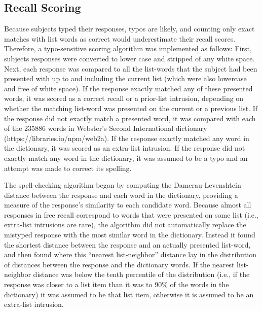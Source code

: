 \documentclass[jou,natbib]{apa6} %
\begin{document}
\subsection{Recall Scoring}
Because subjects typed their responses, typos are likely, and counting only exact matches with list words as correct would underestimate their recall scores. Therefore, a typo-sensitive scoring algorithm was implemented as follows: First, subjects responses were converted to lower case and stripped of any white space. Next, each response was compared to all the list-words that the subject had been presented with up to and including the current list (which were also lowercase and free of white space). If the response exactly matched any of these presented words, it was scored as a correct recall or a prior-list intrusion, depending on whether the matching list-word was presented on the current or a previous list. If the response did not exactly match a presented word, it was compared with each of the 235886 words in Webster's Second International dictionary (https://libraries.io/npm/web2a). If the response exactly matched any word in the dictionary, it was scored as an extra-list intrusion. If the response did not exactly match any word in the dictionary, it was assumed to be a typo and an attempt was made to correct its spelling.

The spell-checking algorithm began by computing the Damerau-Levenshtein distance \citep{Dame64} between the response and each word in the dictionary, providing a measure of the response's similarity to each candidate word. Because almost all responses in free recall correspond to words that were presented on some list (i.e., extra-list intrusions are rare), the algorithm did not automatically replace the mistyped response with the most similar word in the dictionary. Instead it found the shortest distance between the response and an actually presented list-word, and then found where this ``nearest list-neighbor'' distance lay in the distribution of distances between the response and the dictionary words. If the nearest list-neighbor distance was below the tenth percentile of the distribution (i.e., if the response was closer to a list item than it was to 90\% of the words in the dictionary) it was assumed to be that list item, otherwise it is assumed to be an extra-list intrusion.
\end{document}

